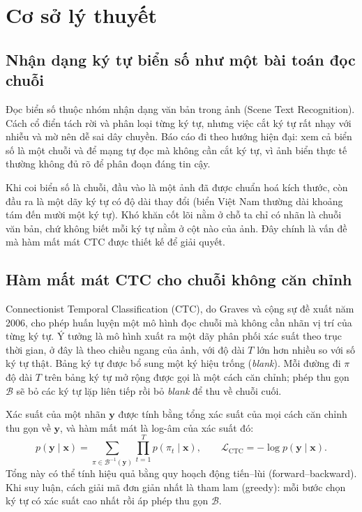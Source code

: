 \documentclass[12pt,a4paper]{report}
\begin{document}
\chapter{Cơ sở lý thuyết}

\section{Nhận dạng ký tự biển số như một bài toán đọc chuỗi}
Đọc biển số thuộc nhóm nhận dạng văn bản trong ảnh (Scene Text Recognition). Cách cổ điển tách rời và phân loại từng ký tự, nhưng việc cắt ký tự rất nhạy với nhiễu và mờ nên dễ sai dây chuyền. Báo cáo đi theo hướng hiện đại: xem cả biển số là một chuỗi và để mạng tự đọc mà không cần cắt ký tự, vì ảnh biển thực tế thường không đủ rõ để phân đoạn đáng tin cậy.

Khi coi biển số là chuỗi, đầu vào là một ảnh đã được chuẩn hoá kích thước, còn đầu ra là một dãy ký tự có độ dài thay đổi (biển Việt Nam thường dài khoảng tám đến mười một ký tự). Khó khăn cốt lõi nằm ở chỗ ta chỉ có nhãn là chuỗi văn bản, chứ không biết mỗi ký tự nằm ở cột nào của ảnh. Đây chính là vấn đề mà hàm mất mát CTC được thiết kế để giải quyết.

\section{Hàm mất mát CTC cho chuỗi không căn chỉnh}
Connectionist Temporal Classification (CTC), do Graves và cộng sự đề xuất năm 2006, cho phép huấn luyện một mô hình đọc chuỗi mà không cần nhãn vị trí của từng ký tự. Ý tưởng là mô hình xuất ra một dãy phân phối xác suất theo trục thời gian, ở đây là theo chiều ngang của ảnh, với độ dài $T$ lớn hơn nhiều so với số ký tự thật. Bảng ký tự được bổ sung một ký hiệu trống (\emph{blank}). Mỗi đường đi $\pi$ độ dài $T$ trên bảng ký tự mở rộng được gọi là một cách căn chỉnh; phép thu gọn $\mathcal{B}$ sẽ bỏ các ký tự lặp liên tiếp rồi bỏ \emph{blank} để thu về chuỗi cuối.

Xác suất của một nhãn $\mathbf{y}$ được tính bằng tổng xác suất của mọi cách căn chỉnh thu gọn về $\mathbf{y}$, và hàm mất mát là log-âm của xác suất đó:
\begin{equation}
p(\mathbf{y}\mid \mathbf{x}) = \sum_{\pi \in \mathcal{B}^{-1}(\mathbf{y})} \prod_{t=1}^{T} p(\pi_t \mid \mathbf{x}),
\qquad
\mathcal{L}_{\text{CTC}} = -\log p(\mathbf{y}\mid \mathbf{x}).
\end{equation}
Tổng này có thể tính hiệu quả bằng quy hoạch động tiến--lùi (forward--backward). Khi suy luận, cách giải mã đơn giản nhất là tham lam (greedy): mỗi bước chọn ký tự có xác suất cao nhất rồi áp phép thu gọn $\mathcal{B}$.
\end{document}
